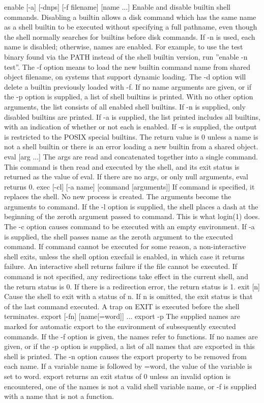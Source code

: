 enable [-a] [-dnps] [-f filename] [name ...]
Enable and disable builtin shell commands. Disabling a builtin allows a disk command which has the same name as a shell builtin to be executed without specifying a full pathname, even though the shell normally searches for builtins before disk commands. If -n is used, each name is disabled; otherwise, names are enabled. For example, to use the test binary found via the PATH instead of the shell builtin version, run ''enable -n test''. The -f option means to load the new builtin command name from shared object filename, on systems that support dynamic loading. The -d option will delete a builtin previously loaded with -f. If no name arguments are given, or if the -p option is supplied, a list of shell builtins is printed. With no other option arguments, the list consists of all enabled shell builtins. If -n is supplied, only disabled builtins are printed. If -a is supplied, the list printed includes all builtins, with an indication of whether or not each is enabled. If -s is supplied, the output is restricted to the POSIX special builtins. The return value is 0 unless a name is not a shell builtin or there is an error loading a new builtin from a shared object.
eval [arg ...]
The args are read and concatenated together into a single command. This command is then read and executed by the shell, and its exit status is returned as the value of eval. If there are no args, or only null arguments, eval returns 0.
exec [-cl] [-a name] [command [arguments]]
If command is specified, it replaces the shell. No new process is created. The arguments become the arguments to command. If the -l option is supplied, the shell places a dash at the beginning of the zeroth argument passed to command. This is what login(1) does. The -c option causes command to be executed with an empty environment. If -a is supplied, the shell passes name as the zeroth argument to the executed command. If command cannot be executed for some reason, a non-interactive shell exits, unless the shell option execfail is enabled, in which case it returns failure. An interactive shell returns failure if the file cannot be executed. If command is not specified, any redirections take effect in the current shell, and the return status is 0. If there is a redirection error, the return status is 1.
exit [n]
Cause the shell to exit with a status of n. If n is omitted, the exit status is that of the last command executed. A trap on EXIT is executed before the shell terminates.
export [-fn] [name[=word]] ...
export -p
The supplied names are marked for automatic export to the environment of subsequently executed commands. If the -f option is given, the names refer to functions. If no names are given, or if the -p option is supplied, a list of all names that are exported in this shell is printed. The -n option causes the export property to be removed from each name. If a variable name is followed by =word, the value of the variable is set to word. export returns an exit status of 0 unless an invalid option is encountered, one of the names is not a valid shell variable name, or -f is supplied with a name that is not a function.
